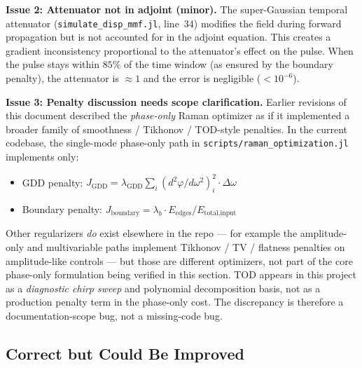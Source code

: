 \documentclass[12pt,a4paper]{article}
\theoremstyle{definition}
\begin{document}
\begin{flagged}
\textbf{Issue 2: Attenuator not in adjoint (minor).} The super-Gaussian temporal attenuator (\texttt{simulate\_disp\_mmf.jl}, line~34) modifies the field during forward propagation but is not accounted for in the adjoint equation. This creates a gradient inconsistency proportional to the attenuator's effect on the pulse. When the pulse stays within $85\%$ of the time window (as ensured by the boundary penalty), the attenuator is $\approx 1$ and the error is negligible ($< 10^{-6}$).
\end{flagged}

\begin{flagged}
\textbf{Issue 3: Penalty discussion needs scope clarification.} Earlier revisions of this document described the \emph{phase-only} Raman optimizer as if it implemented a broader family of smoothness / Tikhonov / TOD-style penalties. In the current codebase, the single-mode phase-only path in \texttt{scripts/raman\_optimization.jl} implements only:
\begin{itemize}
\item GDD penalty: $J_{\text{GDD}} = \lambda_{\text{GDD}} \sum_i (d^2\varphi/d\omega^2)_i^2 \cdot \Delta\omega$
\item Boundary penalty: $J_{\text{boundary}} = \lambda_b \cdot E_{\text{edges}}/E_{\text{total,input}}$
\end{itemize}
Other regularizers \emph{do} exist elsewhere in the repo --- for example the amplitude-only and multivariable paths implement Tikhonov / TV / flatness penalties on amplitude-like controls --- but those are different optimizers, not part of the core phase-only formulation being verified in this section. TOD appears in this project as a \emph{diagnostic chirp sweep} and polynomial decomposition basis, not as a production penalty term in the phase-only cost. The discrepancy is therefore a documentation-scope bug, not a missing-code bug.
\end{flagged}

\subsection{Correct but Could Be Improved}
\end{document}
